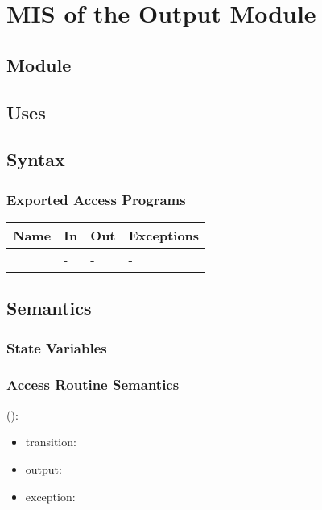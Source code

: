\documentclass[12pt, titlepage]{article}
\begin{document}
\newpage

\section{MIS of the Output Module} 
\label{Module_output}

\subsection{Module}


\subsection{Uses}


\subsection{Syntax}

\subsubsection{Exported Access Programs}

\begin{center}
	\begin{tabular}{p{3cm} p{4cm} p{4cm} p{2cm}}
		\hline
		\textbf{Name} & \textbf{In} & \textbf{Out} & \textbf{Exceptions} \\
		\hline
		\wss{accessProg} & - & - & - \\
		\hline
	\end{tabular}
\end{center}

\subsection{Semantics}

\subsubsection{State Variables}


\subsubsection{Access Routine Semantics}

\noindent {}():
\begin{itemize}
	\item transition:  
	\item output:  
	\item exception:  
\end{itemize}
\end{document}
